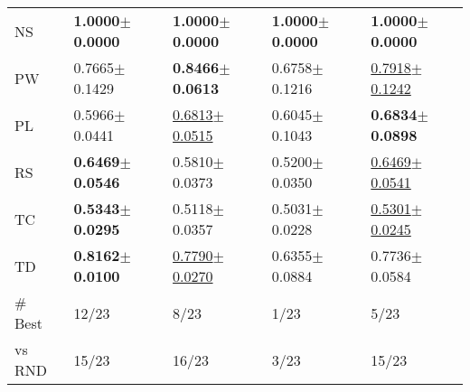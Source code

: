 \begin{tabular}{lllll}
NS & \textbf{1.0000$\pm$0.0000} & \textbf{1.0000$\pm$0.0000} & \textbf{1.0000$\pm$0.0000} & \textbf{1.0000$\pm$0.0000} \\
PW & 0.7665$\pm$0.1429 & \textbf{0.8466$\pm$0.0613} & 0.6758$\pm$0.1216 & \underline{0.7918$\pm$0.1242} \\
PL & 0.5966$\pm$0.0441 & \underline{0.6813$\pm$0.0515} & 0.6045$\pm$0.1043 & \textbf{0.6834$\pm$0.0898} \\
RS & \textbf{0.6469$\pm$0.0546} & 0.5810$\pm$0.0373 & 0.5200$\pm$0.0350 & \underline{0.6469$\pm$0.0541} \\
TC & \textbf{0.5343$\pm$0.0295} & 0.5118$\pm$0.0357 & 0.5031$\pm$0.0228 & \underline{0.5301$\pm$0.0245} \\
TD & \textbf{0.8162$\pm$0.0100} & \underline{0.7790$\pm$0.0270} & 0.6355$\pm$0.0884 & 0.7736$\pm$0.0584 \\
\midrule
\# Best & 12/23 & 8/23 & 1/23 & 5/23 \\
vs RND & 15/23 & 16/23 & 3/23 & 15/23 \\
\bottomrule
\end{tabular}
